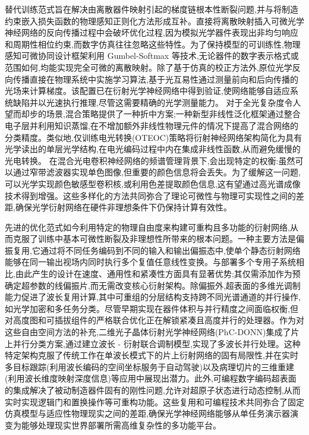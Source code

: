 \documentclass[11pt]{article}
\begin{document}
替代训练范式旨在解决由离散器件映射引起的梯度链根本性断裂问题,并与将制造约束嵌入损失函数的物理感知正则化方法形成互补。直接将离散映射插入可微光学神经网络的反向传播过程中会破坏优化过程,因为模拟光学器件表现出非均匀响应和周期性相位约束,而数字仿真往往忽略这些特性。为了保持模型的可训练性,物理感知可微协同设计框架利用 Gumbel-Softmax 等技术,无论器件的数字表示格式或范围如何,均能实现完全可微的离散映射。除了基于仿真的校正方法外,原位光学反向传播直接在物理系统中实施学习算法,基于光互易性通过测量前向和后向传播的光场来计算梯度。该配置已在衍射光学神经网络中得到验证,使网络能够自适应系统缺陷并以光速执行推理,尽管这需要精确的光学测量能力。\citep{doi_10_1364_prj_389553_d7a30418} 对于全光复杂度令人望而却步的场景,混合策略提供了一种折中方案;一种新型非线性泛化框架通过整合电子层并利用知识蒸馏,在不增加额外非线性物理元件的情况下提高了混合网络的分类精度。类似地,仅训练电光转换(OTEOC)策略将衍射神经网络架构简化为具有光学读出的单层光学结构,在电光编码过程中内在集成非线性函数,从而避免缓慢的光电转换。\citep{doi_10_1364_oe_462370_1269b480} 在混合光电卷积神经网络的频谱管理背景下,会出现特定的权衡:虽然可以通过窄带滤波器实现单色图像,但重要的颜色信息将会丢失。为了缓解这一问题,可以光学实现颜色敏感型卷积核,或利用色差提取颜色信息,这有望通过高光谱成像技术得到增强。这些多样化的方法共同弥合了理论可微性与物理可实现性之间的差距,确保光学衍射网络在硬件非理想条件下仍保持计算有效性。\citep{doi_10_1145_3508352_3549378_13c53996} \citep{doi_10_1364_prj_389553_d7a30418} \citep{doi_10_1364_oe_446890_26d35f03} \citep{doi_10_1364_oe_462370_1269b480} \citep{doi_10_1038_s41598_018_30619_y_5f5bfb09}

先进的优化范式如今利用特定的物理自由度来构建可重构且多功能的衍射网络,从而克服了训练中基本可微性断裂及非理想性所带来的根本问题。一种主要方法是偏振复用,它通过将不同任务编码到不同的输入和输出偏振态中,使单个静态衍射网络能够在同一输出视场内同时执行多个复值任意线性变换。与部署多个专用子系统相比,由此产生的设计在速度、通用性和紧凑性方面具有显著优势;其仅需添加作为预确定超参数的线偏振片,而无需改变核心衍射架构。除偏振外,超表面的多维光调制能力促进了波长复用计算,其中可重组的分层结构支持跨不同光谱通道的并行操作,如光学加密和多任务分类。尽管早期实现在器件体积与并行精度之间面临权衡,但对高度图和可插拔组件的严格联合优化正在解锁紧凑且高度并行的处理器。作为对这些自由空间方法的补充,二维光子晶体衍射光学神经网络(PhC-DONN)集成了片上并行分类方案,通过建立波长 - 衍射联合调制模型,实现了多波长并行处理。这种特定架构克服了传统工作在单波长模式下的片上衍射网络的固有局限性,并在实时多目标跟踪(利用波长编码的空间坐标服务于自动驾驶)以及病理切片的三维重建(利用波长维度映射深度信息)等应用中展现出潜力。此外,可编程数字编码超表面的集成解决了被动制造器件固有的刚性问题,允许对超原子状态进行动态控制,从而实时实现逻辑门和置换操作等可重构功能。这些复用和可编程技术共同弥合了固定仿真模型与适应性物理现实之间的差距,确保光学神经网络能够从单任务演示器演变为能够处理现实世界部署所需高维复杂性的多功能平台。\citep{doi_10_1038_s41377_022_00849_x_e31226af} \citep{doi_10_1515_nanoph_2024_0483_f81cb7ab} \citep{doi_10_1038_s41928_022_00719_9_a2169947} \citep{doi_10_1515_nanoph_2025_0168_86a0f7aa}
\end{document}
